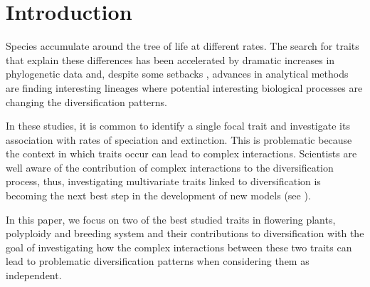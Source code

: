 \section{Introduction}

Species accumulate around the tree of life at different rates.
The search for traits that explain these differences has been accelerated by dramatic increases in phylogenetic data and, despite some setbacks \citep{maddison_2015, rabosky_2015, moore_2016}, advances in analytical methods \citep{maddison_2007, fitzjohn_2009, goldberg_2012, beaulieu_2016, rabosky_2017} are finding interesting lineages where potential interesting biological processes are changing the  diversification patterns. %

In these studies, it is common to identify a single focal trait and investigate its association with rates of speciation and extinction. This is problematic because the context in which traits occur can lead to complex interactions. Scientists are well aware of the contribution of complex interactions to the diversification process, thus, investigating multivariate traits linked to diversification is becoming the next best step in the development of new models (see \citet{caetano_2018, herrera_2018}). %

In this paper, we focus on two of the best studied traits in flowering plants, polyploidy and breeding system and their contributions to diversification with the goal of investigating how the complex interactions between these two traits can lead to problematic diversification patterns when considering them as independent. %

